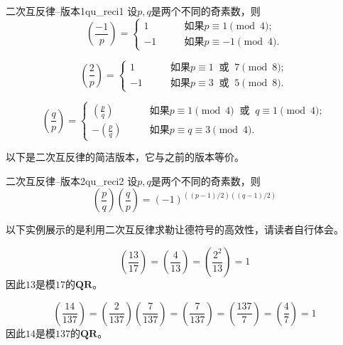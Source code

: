   \begin{theorem}{二次互反律--版本1}{qu_reci1}
  设$p,q$是两个不同的奇素数，则
    \[
      \left(\frac{-1}{p}\right) = 
       \begin{cases}
       1 & \qquad \text{如果} p \equiv 1 \pmod{4};\\
       -1 & \qquad \text{如果} p \equiv -1 \pmod{4}.
       \end{cases}
     \]
     
   \[
     \left(\frac{2}{p}\right) = 
      \begin{cases}
      1 & \qquad \text{如果} p \equiv 1\;\; \text{或}\;\; 7 \pmod{8};\\
      -1 & \qquad \text{如果} p \equiv 3 \;\; \text{或} \;\; 5 \pmod{8}.
      \end{cases}
    \]
    
     \[
         \left(\frac{q}{p}\right) = 
          \begin{cases}
          \left(\frac{p}{q}\right)  & \qquad \text{如果} p \equiv 1 \pmod{4} \;\; \text{或}\;\; q \equiv 1 \pmod{4};  \\
          - \left(\frac{p}{q}\right)  & \qquad \text{如果} p \equiv q \equiv 3 \pmod{4} .
          \end{cases}
        \]
  \end{theorem}
以下是二次互反律的简洁版本，它与之前的版本等价。
\begin{theorem}{二次互反律--版本2}{qu_reci2}
 设$p,q$是两个不同的奇素数，则
 \begin{equation*}
 \left(\frac{p}{q}\right) \left(\frac{q}{p} \right) = (-1)^{((p-1)/2)((q-1)/2)}
 \end{equation*}
 \end{theorem}
 
 以下实例展示的是利用二次互反律求勒让德符号的高效性，请读者自行体会。
 \begin{example}
 \[ \left(\frac{13}{17} \right) = \left(\frac{4}{13} \right) = \left(\frac{2^2}{13} \right) = 1\]
   因此$13$是模$17$的$\mathbf{QR}$。
   
 \[ \left(\frac{14}{137} \right) = \left(\frac{2}{137} \right) \left(\frac{7}{137} \right) = \left(\frac{7}{137} \right) = \left(\frac{137}{7} \right) = \left(\frac{4}{7} \right) = 1 \]
  因此$14$是模$137$的$\mathbf{QR}$。
  
 \end{example}
 
